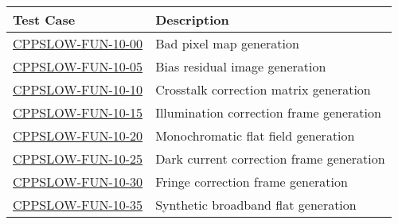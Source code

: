 \begin{longtable} {|p{}|p{}|}\hline
\textbf{Test Case}  & \textbf{Description} \\\hline
\hyperref[cppslow-fun-10-00]{CPPSLOW-FUN-10-00} & Bad pixel map generation \\\hline
\hyperref[cppslow-fun-10-05]{CPPSLOW-FUN-10-05} & Bias residual image generation \\\hline
\hyperref[cppslow-fun-10-10]{CPPSLOW-FUN-10-10} & Crosstalk correction matrix generation \\\hline
\hyperref[cppslow-fun-10-15]{CPPSLOW-FUN-10-15} & Illumination correction frame generation \\\hline
\hyperref[cppslow-fun-10-20]{CPPSLOW-FUN-10-20} & Monochromatic flat field generation \\\hline
\hyperref[cppslow-fun-10-25]{CPPSLOW-FUN-10-25} & Dark current correction frame generation \\\hline
\hyperref[cppslow-fun-10-30]{CPPSLOW-FUN-10-30} & Fringe correction frame generation \\\hline
\hyperref[cppslow-fun-10-35]{CPPSLOW-FUN-10-35} & Synthetic broadband flat generation \\\hline
\end{longtable}
